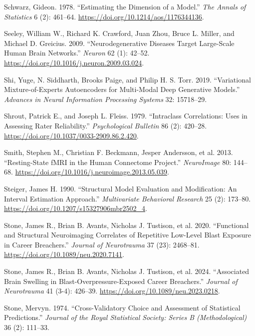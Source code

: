 \documentclass[
  10pt,
  letterpaper,
]{report}
\newlength{\cslhangindent}
\newenvironment{CSLReferences}[2] %
 {\begin{list}{}{%
  \setlength{\itemindent}{0pt}
  \setlength{\leftmargin}{0pt}
  \setlength{\parsep}{0pt}
  \ifodd #1
   \setlength{\leftmargin}{\cslhangindent}
   \setlength{\itemindent}{-1\cslhangindent}
  \fi
  \setlength{\itemsep}{#2\baselineskip}}}
 {\end{list}}
\begin{document}
\begin{CSLReferences}{1}{1}
Schwarz, Gideon. 1978. {``Estimating the Dimension of a Model.''}
\emph{The Annals of Statistics} 6 (2): 461--64.
\url{https://doi.org/10.1214/aos/1176344136}.

Seeley, William W., Richard K. Crawford, Juan Zhou, Bruce L. Miller, and
Michael D. Greicius. 2009. {``Neurodegenerative Diseases Target
Large-Scale Human Brain Networks.''} \emph{Neuron} 62 (1): 42--52.
\url{https://doi.org/10.1016/j.neuron.2009.03.024}.

Shi, Yuge, N. Siddharth, Brooks Paige, and Philip H. S. Torr. 2019.
{``Variational Mixture-of-Experts Autoencoders for Multi-Modal Deep
Generative Models.''} \emph{Advances in Neural Information Processing
Systems} 32: 15718--29.

Shrout, Patrick E., and Joseph L. Fleiss. 1979. {``Intraclass
Correlations: Uses in Assessing Rater Reliability.''}
\emph{Psychological Bulletin} 86 (2): 420--28.
\url{https://doi.org/10.1037/0033-2909.86.2.420}.

{Smith, Stephen M., Christian F. Beckmann, Jesper Andersson, et al.}
2013. {``Resting-State {fMRI} in the {Human Connectome Project}.''}
\emph{NeuroImage} 80: 144--68.
\url{https://doi.org/10.1016/j.neuroimage.2013.05.039}.

Steiger, James H. 1990. {``Structural Model Evaluation and Modification:
An Interval Estimation Approach.''} \emph{Multivariate Behavioral
Research} 25 (2): 173--80.
\url{https://doi.org/10.1207/s15327906mbr2502_4}.

{Stone, James R., Brian B. Avants, Nicholas J. Tustison, et al.} 2020.
{``Functional and Structural Neuroimaging Correlates of Repetitive
Low-Level Blast Exposure in Career Breachers.''} \emph{Journal of
Neurotrauma} 37 (23): 2468--81.
\url{https://doi.org/10.1089/neu.2020.7141}.

Stone, James R., Brian B. Avants, Nicholas J. Tustison, et al. 2024.
{``Associated Brain Swelling in Blast-Overpressure-Exposed Career
Breachers.''} \emph{Journal of Neurotrauma} 41 (3-4): 426--39.
\url{https://doi.org/10.1089/neu.2023.0218}.

Stone, Mervyn. 1974. {``Cross-Validatory Choice and Assessment of
Statistical Predictions.''} \emph{Journal of the Royal Statistical
Society: Series B (Methodological)} 36 (2): 111--33.


\end{CSLReferences}
\end{document}
